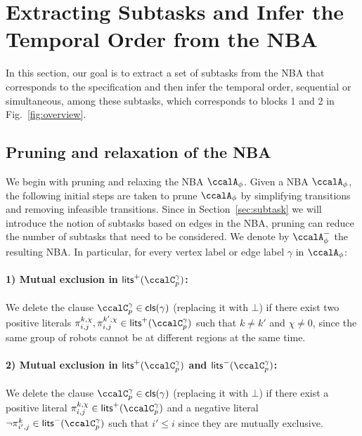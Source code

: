 \documentclass[Afour,sageh,times]{sagej}
\newcounter{mycounter}
\newenvironment{noindlist}
 {\begin{list}{\arabic{mycounter})~~}{\usecounter{mycounter} \labelsep=0em \labelwidth=0em \leftmargin=0em \itemindent=0em}}
 {\end{list}}
\newcommand{\cp}[2]{\ccalC_{#1}^{#2}}
\newcommand{\autop}{\ccalA_{\phi}}
\renewcommand{\ap}[3]{\mathcal{\pi}_{{#1},{#2}}^{#3}}
\begin{document}
{   


\section{Extracting Subtasks and Infer the Temporal Order from the NBA}\label{sec:app}
     In this section, our goal is to extract a set of subtasks from the NBA that corresponds to the specification and then infer the temporal order, sequential or simultaneous, among these subtasks, which corresponds to blocks 1 and 2 in Fig.~\ref{fig:overview}.
\subsection{{Pruning and relaxation of the NBA}}\label{sec:prune}

We begin with pruning and relaxing the NBA $\autop$. Given a NBA $\autop$, the following initial steps are taken to prune $\autop$ by simplifying transitions and removing infeasible transitions. Since in Section~\ref{sec:subtask} we will introduce the notion of subtasks based on edges in the NBA, pruning can reduce the number of subtasks that need to be considered.
We denote by $\autop^-$ the resulting NBA. In particular, for every vertex label or edge label $\gamma$ in $\autop$:
\paragraph{1) Mutual exclusion in $\mathsf{lits}^+(\cp{p}{\gamma})$:}\label{prune:2} We delete the clause $\cp{p}{\gamma} \in \mathsf{cls}(\gamma)$ (replacing it with $\bot$) if there exist two positive literals $\ap{i}{j}{k,\chi}, \ap{i}{j}{k',\chi} \in \mathsf{lits}^+(\cp{p}{\gamma})$ such that $k\not= k'$ and $\chi\not=0$, since the same group of robots cannot be at different regions at the same time.
 \paragraph{2) Mutual exclusion in $\mathsf{lits}^+(\cp{p}{\gamma})$  and $\mathsf{lits}^-(\cp{p}{\gamma})$:} \label{prune:2} We delete the clause $\cp{p}{\gamma} \in \mathsf{cls}(\gamma)$ (replacing it with $\bot$) if there exist a positive literal $\ap{i}{j}{k,\chi} \in \mathsf{lits}^+(\cp{p}{\gamma})$ and a negative literal $\neg \ap{i'}{j}{k} \in \mathsf{lits}^-(\cp{p}{\gamma})$ such that $i' \leq i$ since they are mutually  exclusive.
}
\end{document}
